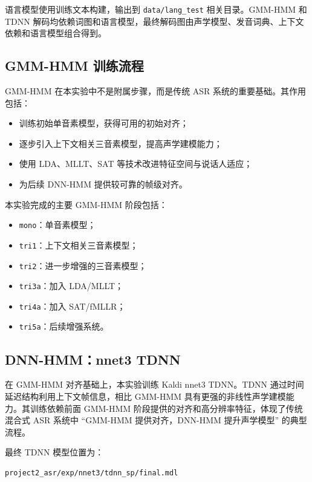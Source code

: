 \documentclass[UTF8,a4paper,12pt]{ctexart}
\begin{document}
语言模型使用训练文本构建，输出到 \texttt{data/lang\_test} 相关目录。GMM-HMM 和 TDNN 解码均依赖词图和语言模型，最终解码图由声学模型、发音词典、上下文依赖和语言模型组合得到。

\subsection{GMM-HMM 训练流程}

GMM-HMM 在本实验中不是附属步骤，而是传统 ASR 系统的重要基础。其作用包括：

\begin{itemize}
  \item 训练初始单音素模型，获得可用的初始对齐；
  \item 逐步引入上下文相关三音素模型，提高声学建模能力；
  \item 使用 LDA、MLLT、SAT 等技术改进特征空间与说话人适应；
  \item 为后续 DNN-HMM 提供较可靠的帧级对齐。
\end{itemize}

本实验完成的主要 GMM-HMM 阶段包括：

\begin{itemize}
  \item \texttt{mono}：单音素模型；
  \item \texttt{tri1}：上下文相关三音素模型；
  \item \texttt{tri2}：进一步增强的三音素模型；
  \item \texttt{tri3a}：加入 LDA/MLLT；
  \item \texttt{tri4a}：加入 SAT/fMLLR；
  \item \texttt{tri5a}：后续增强系统。
\end{itemize}

\subsection{DNN-HMM：nnet3 TDNN}

在 GMM-HMM 对齐基础上，本实验训练 Kaldi nnet3 TDNN。TDNN 通过时间延迟结构利用上下文帧信息，相比 GMM-HMM 具有更强的非线性声学建模能力。其训练依赖前面 GMM-HMM 阶段提供的对齐和高分辨率特征，体现了传统混合式 ASR 系统中 ``GMM-HMM 提供对齐，DNN-HMM 提升声学模型'' 的典型流程。

最终 TDNN 模型位置为：

\begin{lstlisting}
project2_asr/exp/nnet3/tdnn_sp/final.mdl
\end{lstlisting}
\end{document}

